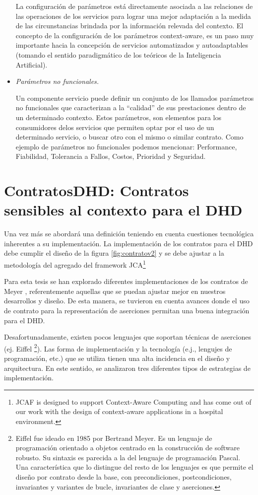 \begin{itemize}
La configuración de parámetros está directamente asociada a las relaciones de las operaciones de los servicios para lograr una mejor adaptación a la medida de las circunstancias brindada por la información relevada del contexto. El concepto de la configuración de los parámetros context-aware, es un paso muy importante hacia la concepción de servicios automatizados y autoadaptables (tomando el sentido paradigmático de los teóricos de la Inteligencia Artificial).


\item \textit{Parámetros no funcionales.} 

Un componente servicio puede definir un conjunto de los llamados parámetros no funcionales que caracterizan a la “calidad” de sus prestaciones dentro de un determinado contexto. Estos parámetros, son elementos para los consumidores delos servicios que permiten optar por el uso de un determinado servicio, o buscar otro con el mismo o similar contrato. Como ejemplo de parámetros no funcionales podemos mencionar: Performance, Fiabilidad, Tolerancia a Fallos, Costos, Prioridad y Seguridad.

\end{itemize}


\section{ContratosDHD: Contratos sensibles al contexto para el DHD}
\label{sec:estrategiasca}


Una vez más se abordará una definición teniendo en cuenta cuestiones tecnológica inherentes a su implementación. La implementación de los contratos para el DHD debe cumplir el diseño de la figura \ref{fig:contratov2} y se debe ajustar a la metodología del agregado del framework JCA\footnote{JCAF is designed to support Context-Aware Computing and has come out of our work with the design of context-aware applications in a hospital environment.} %
 

Para esta tesis se han explorado diferentes implementaciones de los contratos de Meyer \cite{Meyer}, referentemente aquellas que se puedan ajustar mejor en nuestros desarrollos y diseño. De esta manera, se tuvieron en cuenta avances donde el uso de contrato para la representación de aserciones permitan una buena integración para el DHD. 

Desafortunadamente, existen pocos lenguajes que soportan técnicas de aserciones (ej. Eiffel \footnote{Eiffel fue ideado en 1985 por Bertrand Meyer. Es un lenguaje de programación orientado a objetos centrado en la construcción de software robusto. Su sintaxis es parecida a la del lenguaje de programación Pascal. Una característica que lo distingue del resto de los lenguajes es que permite el diseño por contrato desde la base, con precondiciones, postcondiciones, invariantes y variantes de bucle, invariantes de clase y aserciones.}). Las forma de implementación y la tecnología (e.j., lengujes de programación, etc.) que se utiliza tienen una alta incidencia en el diseño y arquitectura. En este sentido, se analizaron tres diferentes tipos de estrategias de implementación.

